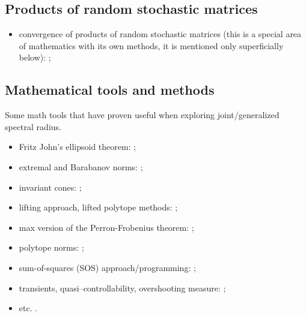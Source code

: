 \subsection*{Products of random stochastic matrices}
\begin{itemize}

\item convergence of products of random stochastic matrices (this is a special area of mathematics with its own methods, it is mentioned only superficially below): \cite{AT:JMAA77, BXMS:IEEETSP13, Cohn:IJMMS, CMS:LAA21, DHH:ArXiv14, DHX:AUT11, OgurMart:LAA13, Leiz:LAA92, LimaRah:JPA94, Prot:MS11, Thomas:ArXiv11, Thomas:ArXiv13, Wolf:PAMS};
\end{itemize}

\subsection*{Mathematical tools and methods}
Some math tools that have proven useful when exploring joint/generalized spectral radius.

\begin{itemize}
\item Fritz John's ellipsoid theorem: \cite{ShihHsu:JNCA11, JohnF:48, JohnF:2014, Howard97, Shih:TM99};
\item extremal and Barabanov norms: \cite{ABMW:MTNS12, Bar:AIT88-5:e, Bar:AIT88-3:e, Bar:AIT88-2:e, Dai:JMAA11, GWZ:SIAMJMA05, GugZen:SIAMJMAA09, Koz:ArXiv21, MasWir:LAA14, MejProt:ArXiv21-2, Morris:LAA10, Morris:SIAMJMAA12, Prot:LAA08, TeiMarg:Autom12, Wirth:CDC05, Wirth:LAA02, Wirth:MNTS02};
\item invariant cones: \cite{Seneta06};
\item lifting approach, lifted polytope methods: \cite{BN03, JGC:SIAMJMAA14, Koz:LAA14, ParJdb:LAA08, JSRToolbox, XuAci:IEEETAC20};
\item max version of the Perron-Frobenius theorem: \cite{Bapat:LAA98};
\item polytope norms: \cite{GWZ:SIAMJMA05, GugZen:SIAMJMAA09, GugZen:JCA97};
\item sum-of-squares (SOS) approach/programming: \cite{Ahmadi08, AhmJun:CDC13, AhmJun14, AJPR:SIAMJCO14, AJPR:HCSS11, AhmPar:CDC05, DRD:IEEETAC18, LJP:HSCC16, LPG:SIAM20, ParJdb:LNCS07, ParJdb:LAA08, WangMM:ACC21, ZhangXu:ArXiv20};
\item transients, quasi--controllability, overshooting measure: \cite{KKP:IFAC94, KKP:CESA98, KozPok:CADSEM96-005, PW:LAA08, PWB:CDC05};
\item etc. \cite{Bochi:LAA03, Gelf:MatSb41:e, Rota03}.
\end{itemize}



